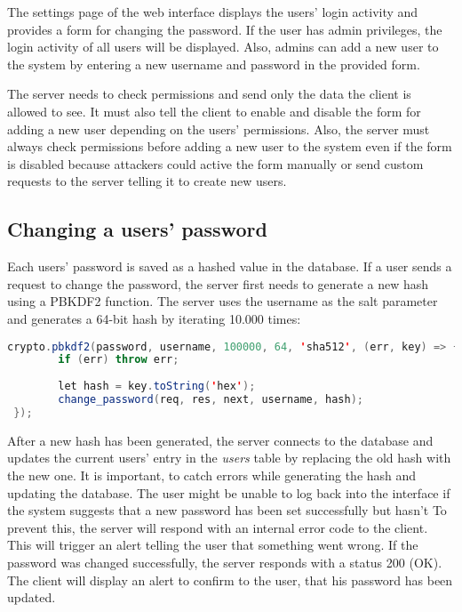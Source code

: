 The settings page of the web interface displays the users' login activity and provides a form for changing the password. If the user has admin privileges, the login activity of all users will be displayed. Also, admins can add a new user to the system by entering a new username and password in the provided form.

The server needs to check permissions and send only the data the client is allowed to see. It must also tell the client to enable and disable the form for adding a new user depending on the users' permissions. Also, the server must always check permissions before adding a new user to the system even if the form is disabled because attackers could active the form manually or send custom requests to the server telling it to create new users.



\subsection{Changing a users' password}
\label{subsec:changing_the_password}

Each users' password is saved as a hashed value in the database. If a user sends a request to change the password, the server first needs to generate a new hash using a PBKDF2 function. The server uses the username as the salt parameter and generates a 64-bit hash by iterating 10.000 times:

\begin{lstlisting}[language = Java, numbers = none]
 crypto.pbkdf2(password, username, 100000, 64, 'sha512', (err, key) => {
 		if (err) throw err; 
 		
 		let hash = key.toString('hex');
 		change_password(req, res, next, username, hash);                      
 });
\end{lstlisting}

After a new hash has been generated, the server connects to the database and updates the current users' entry in the \textit{users} table by replacing the old hash with the new one. It is important, to catch errors while generating the hash and updating the database. The user might be unable to log back into the interface if the system suggests that a new password has been set successfully but hasn’t To prevent this, the server will respond with an internal error code to the client. This will trigger an alert telling the user that something went wrong. If the password was changed successfully, the server responds with a status 200 (OK). The client will display an alert to confirm to the user, that his password has been updated.



